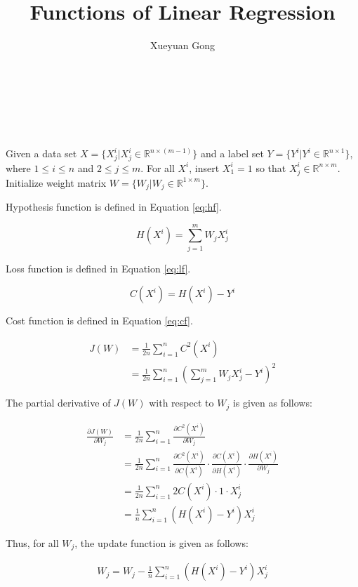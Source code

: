 \documentclass{sig-alternate}
\begin{document}
\title{Functions of Linear Regression}

\author{
	\alignauthor
	Xueyuan Gong\\
	\\
	\\
    \\
    \\
}

\maketitle

Given a data set $X=\{X^{i}_{j}|X^{i}_{j}\in \mathbb{R}^{n\times (m-1)}\}$ and a label set $Y=\{Y^{i}|Y^{i}\in \mathbb{R}^{n\times 1}\}$, where $1\leq i\leq n$ and $2\leq j \leq m$. For all $X^{i}$, insert $X^{i}_{1}=1$ so that $X^{i}_{j}\in \mathbb{R}^{n\times m}$. Initialize weight matrix $W=\{W_{j}|W_{j}\in \mathbb{R}^{1\times m}\}$.

Hypothesis function is defined in Equation \eqref{eq:hf}.

\begin{equation}
\label{eq:hf}
	H(X^{i})=\sum_{j=1}^{m}W_{j}X^{i}_{j}
\end{equation}

Loss function is defined in Equation \eqref{eq:lf}.

\begin{equation}
\label{eq:lf}
	C(X^{i})=H(X^{i})-Y^{i}
\end{equation}

Cost function is defined in Equation \eqref{eq:cf}.

\begin{equation}
\label{eq:cf}
	\begin{aligned}
	J(W)&=\frac{1}{2n}\sum_{i=1}^{n}C^2(X^{i})\\
		&=\frac{1}{2n}\sum_{i=1}^{n}(\sum_{j=1}^{m}W_{j}X^{i}_{j}-Y^{i})^{2}
	\end{aligned}
\end{equation}

The partial derivative of $J(W)$ with respect to $W_{j}$ is given as follows:

\begin{align*}
	\frac{\partial{J(W)}}{\partial{W_{j}}}
	&=\frac{1}{2n}\sum_{i=1}^{n}\frac{\partial{C^2(X^{i})}}{\partial{W_{j}}}\\
	&=\frac{1}{2n}\sum_{i=1}^{n}\frac{\partial{C^2(X^{i})}}{\partial{C(X^{i})}}\cdot \frac{\partial{C(X^{i})}}{\partial{H(X^{i})}}\cdot \frac{\partial{H(X^{i})}}{\partial{W_{j}}}\\
	&=\frac{1}{2n}\sum_{i=1}^{n}2C(X^{i})\cdot 1\cdot X^{i}_{j}\\
	&=\frac{1}{n}\sum_{i=1}^{n}(H(X^{i})-Y^{i})X^{i}_{j}
\end{align*}

Thus, for all $W_{j}$, the update function is given as follows:

\begin{align*}
	W_{j}=W_{j}-\frac{1}{n}\sum_{i=1}^{n}(H(X^{i})-Y^{i})X^{i}_{j}
\end{align*}
\end{document}
